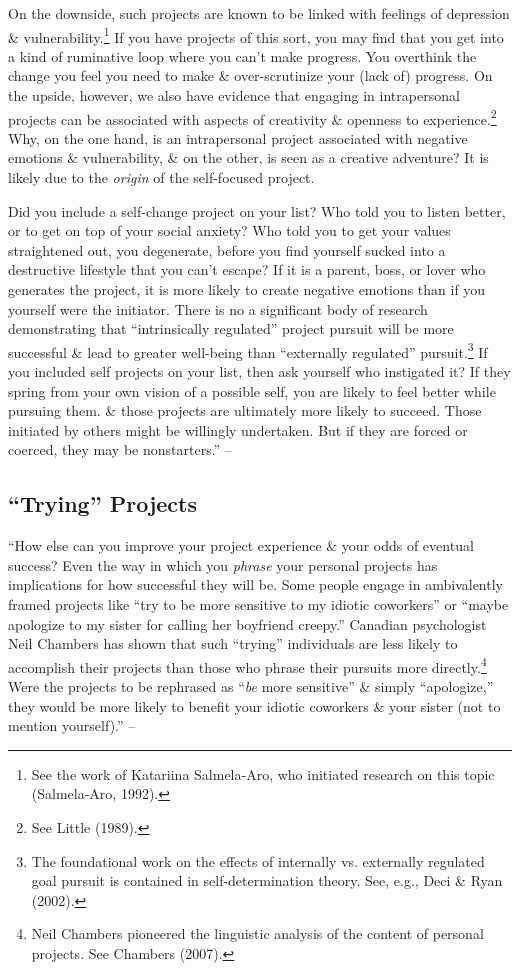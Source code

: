 \documentclass{article}
\numberwithin{equation}{section}
\begin{document}
On the downside, such projects are known to be linked with feelings of depression \& vulnerability.\footnote{See the work of Katariina Salmela-Aro, who initiated research on this topic (Salmela-Aro, 1992).} If you have projects of this sort, you may find that you get into a kind of ruminative loop where you can't make progress. You overthink the change you feel you need to make \& over-scrutinize your (lack of) progress. On the upside, however, we also have evidence that engaging in intrapersonal projects can be associated with aspects of creativity \& openness to experience.\footnote{See Little (1989).} Why, on the one hand, is an intrapersonal project associated with negative emotions \& vulnerability, \& on the other, is seen as a creative adventure? It is likely due to the \textit{origin} of the self-focused project.

Did you include a self-change project on your list? Who told you to listen better, or to get on top of your social anxiety? Who told you to get your values straightened out, you degenerate, before you find yourself sucked into a destructive lifestyle that you can't escape? If it is a parent, boss, or lover who generates the project, it is more likely to create negative emotions than if you yourself were the initiator. There is no a significant body of research demonstrating that ``intrinsically regulated'' project pursuit will be more successful \& lead to greater well-being than ``externally regulated'' pursuit.\footnote{The foundational work on the effects of internally vs. externally regulated goal pursuit is contained in self-determination theory. See, e.g., Deci \& Ryan (2002).} If you included self projects on your list, then ask yourself who instigated it? If they spring from your own vision of a possible self, you are likely to feel better while pursuing them. \& those projects are ultimately more likely to succeed. Those initiated by others might be willingly undertaken. But if they are forced or coerced, they may be nonstarters.'' -- \cite[pp. 32--33]{Little2017}

\subsection{``Trying'' Projects}
``How else can you improve your project experience \& your odds of eventual success? Even the way in which you \textit{phrase} your personal projects has implications for how successful they will be. Some people engage in ambivalently framed projects like ``try to be more sensitive to my idiotic coworkers'' or ``maybe apologize to my sister for calling her boyfriend creepy.'' Canadian psychologist Neil Chambers has shown that such ``trying'' individuals are less likely to accomplish their projects than those who phrase their pursuits more directly.\footnote{Neil Chambers pioneered the linguistic analysis of the content of personal projects. See Chambers (2007).} Were the projects to be rephrased as ``\textit{be} more sensitive'' \& simply ``apologize,'' they would be more likely to benefit your idiotic coworkers \& your sister (not to mention yourself).'' -- \cite[p. 33]{Little2017}
\end{document}
